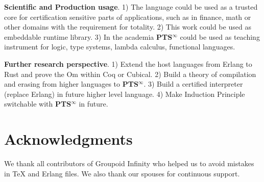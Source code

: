 \documentclass{aip-cp}
\begin{document}
{\bf Scientific and Production usage}.
1) The language could be used as a trusted core for certification sensitive parts of applications, such as in finance, math or other domains with the requirement for totality.
2) This work could be used as embeddable runtime library.
3) In the academia {\bf PTS$^\infty$} could be used as teaching instrument for logic, type systems, lambda calculus, functional languages.

{\bf Further research perspective}.
1) Extend the host languages from Erlang to Rust and prove the Om within Coq or Cubical.
2) Build a theory of compilation and erasing from higher languages to {\bf PTS$^\infty$}.
3) Build a certified interpreter (replace Erlang) in future higher level language.
4) Make Induction Principle switchable with {\bf PTS$^\infty$} in future.

\section{Acknowledgments}
We thank all contributors of Groupoid Infinity who helped us to avoid mistakes in TeX and Erlang files.
We also thank our spouses for continuous support.



\end{document}
